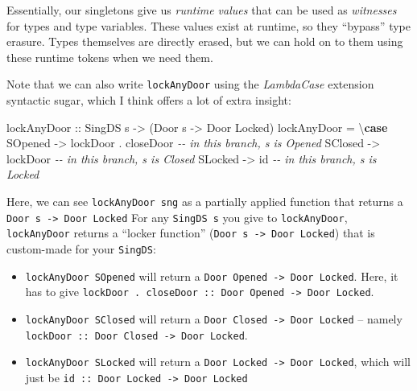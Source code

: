 \documentclass[]{article}
\newenvironment{Shaded}{}{}
\newcommand{\CommentTok}[1]{\textcolor[rgb]{0.38,0.63,0.69}{\textit{#1}}}
\newcommand{\DataTypeTok}[1]{\textcolor[rgb]{0.56,0.13,0.00}{#1}}
\newcommand{\FunctionTok}[1]{\textcolor[rgb]{0.02,0.16,0.49}{#1}}
\newcommand{\KeywordTok}[1]{\textcolor[rgb]{0.00,0.44,0.13}{\textbf{#1}}}
\newcommand{\NormalTok}[1]{#1}
\newcommand{\OperatorTok}[1]{\textcolor[rgb]{0.40,0.40,0.40}{#1}}
\newcommand{\OtherTok}[1]{\textcolor[rgb]{0.00,0.44,0.13}{#1}}
\begin{document}
Essentially, our singletons give us \emph{runtime values} that can be used as
\emph{witnesses} for types and type variables. These values exist at runtime, so
they ``bypass'' type erasure. Types themselves are directly erased, but we can
hold on to them using these runtime tokens when we need them.

Note that we can also write \texttt{lockAnyDoor} using the \emph{LambdaCase}
extension syntactic sugar, which I think offers a lot of extra insight:

\begin{Shaded}
\begin{Highlighting}[]
\OtherTok{lockAnyDoor ::} \DataTypeTok{SingDS}\NormalTok{ s }\OtherTok{{-}>}\NormalTok{ (}\DataTypeTok{Door}\NormalTok{ s }\OtherTok{{-}>} \DataTypeTok{Door} \DataTypeTok{\textquotesingle{}Locked}\NormalTok{)}
\NormalTok{lockAnyDoor }\OtherTok{=}\NormalTok{ \textbackslash{}}\KeywordTok{case}
    \DataTypeTok{SOpened} \OtherTok{{-}>}\NormalTok{ lockDoor }\OperatorTok{.}\NormalTok{ closeDoor  }\CommentTok{{-}{-} in this branch, s is \textquotesingle{}Opened}
    \DataTypeTok{SClosed} \OtherTok{{-}>}\NormalTok{ lockDoor              }\CommentTok{{-}{-} in this branch, s is \textquotesingle{}Closed}
    \DataTypeTok{SLocked} \OtherTok{{-}>} \FunctionTok{id}                    \CommentTok{{-}{-} in this branch, s is \textquotesingle{}Locked}
\end{Highlighting}
\end{Shaded}

Here, we can see \texttt{lockAnyDoor\ sng} as a partially applied function that
returns a \texttt{Door\ s\ -\textgreater{}\ Door\ \textquotesingle{}Locked} For
any \texttt{SingDS\ s} you give to \texttt{lockAnyDoor}, \texttt{lockAnyDoor}
returns a ``locker function''
(\texttt{Door\ s\ -\textgreater{}\ Door\ \textquotesingle{}Locked}) that is
custom-made for your \texttt{SingDS}:

\begin{itemize}
\item
  \texttt{lockAnyDoor\ SOpened} will return a
  \texttt{Door\ \textquotesingle{}Opened\ -\textgreater{}\ Door\ \textquotesingle{}Locked}.
  Here, it has to give
  \texttt{lockDoor\ .\ closeDoor\ ::\ Door\ \textquotesingle{}Opened\ -\textgreater{}\ Door\ \textquotesingle{}Locked}.
\item
  \texttt{lockAnyDoor\ SClosed} will return a
  \texttt{Door\ \textquotesingle{}Closed\ -\textgreater{}\ Door\ \textquotesingle{}Locked}
  -- namely
  \texttt{lockDoor\ ::\ Door\ \textquotesingle{}Closed\ -\textgreater{}\ Door\ \textquotesingle{}Locked}.
\item
  \texttt{lockAnyDoor\ SLocked} will return a
  \texttt{Door\ \textquotesingle{}Locked\ -\textgreater{}\ Door\ \textquotesingle{}Locked},
  which will just be
  \texttt{id\ ::\ Door\ \textquotesingle{}Locked\ -\textgreater{}\ Door\ \textquotesingle{}Locked}
\end{itemize}
\end{document}
